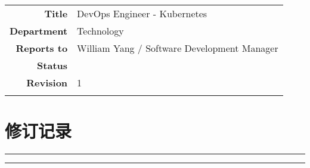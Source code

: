 \documentclass[12pt,a4paper]{report}
\begin{document}
\begin{tabular}{ r l }
  \hline\noalign{\smallskip}
  \textbf{Title} & DevOps Engineer - Kubernetes \\
  \textbf{Department} & Technology \\
  \textbf{Reports to} & William Yang / Software Development Manager \\
  \textbf{Status} & \\
  \textbf{Revision} & 1 \\
  \noalign{\smallskip}\hline
\end{tabular}


\appendix
\renewcommand{\contentsname}{附录}
\setlength{\parindent}{0pt}
\chapter{修订记录}

\rule[-0.3em]{0.38em}{1.1em}%
\par\medbreak
\hrule width.38em height1.1em depth-.3em
\end{document}

